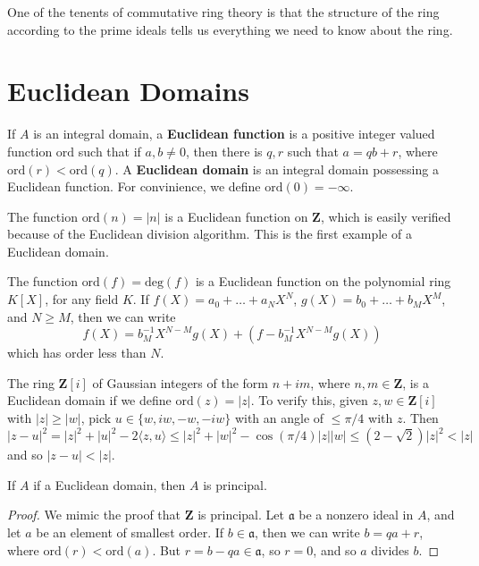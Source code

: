 One of the tenents of commutative ring theory is that the structure of the ring according to the prime ideals tells us everything we need to know about the ring.

\section{Euclidean Domains}

If $A$ is an integral domain, a {\bf Euclidean function} is a positive integer valued function $\text{ord}$ such that if $a,b \neq 0$, then there is $q,r$ such that $a = qb + r$, where $\text{ord}(r) < \text{ord}(q)$. A {\bf Euclidean domain} is an integral domain possessing a Euclidean function. For convinience, we define $\text{ord}(0) = -\infty$.

\begin{example}
    The function $\text{ord}(n) = |n|$ is a Euclidean function on $\mathbf{Z}$, which is easily verified because of the Euclidean division algorithm. This is the first example of a Euclidean domain.
\end{example}

\begin{example}
    The function $\text{ord}(f) = \text{deg}(f)$ is a Euclidean function on the polynomial ring $K[X]$, for any field $K$. If $f(X) = a_0 + \dots + a_NX^N$, $g(X) = b_0 + \dots + b_MX^M$, and $N \geq M$, then we can write
    \[ f(X) = b_M^{-1} X^{N-M} g(X) + (f - b_M^{-1} X^{N-M}g(X)) \]
    which has order less than $N$.
\end{example}

\begin{example}
    The ring $\mathbf{Z}[i]$ of Gaussian integers of the form $n + im$, where $n,m \in \mathbf{Z}$, is a Euclidean domain if we define $\text{ord}(z) = |z|$. To verify this, given $z,w \in \mathbf{Z}[i]$ with $|z| \geq |w|$, pick $u \in \{ w, iw, -w, -iw \}$ with an angle of $\leq \pi/4$ with $z$. Then
    \[ |z - u|^2 = |z|^2 + |u|^2 - 2 \langle z, u \rangle \leq |z|^2 + |w|^2 - \cos(\pi/4) |z||w| \leq (2 - \sqrt{2}) |z|^2 < |z| \]
    and so $|z - u| < |z|$.
\end{example}

\begin{theorem}
    If $A$ if a Euclidean domain, then $A$ is principal.
\end{theorem}
\begin{proof}
    We mimic the proof that $\mathbf{Z}$ is principal. Let $\mathfrak{a}$ be a nonzero ideal in $A$, and let $a$ be an element of smallest order. If $b \in \mathfrak{a}$, then we can write $b = qa + r$, where $\text{ord}(r) < \text{ord}(a)$. But $r = b - qa \in \mathfrak{a}$, so $r = 0$, and so $a$ divides $b$.
\end{proof}

